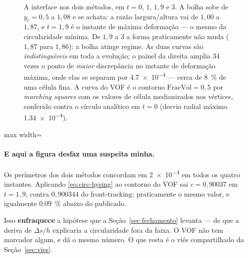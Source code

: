 \begin{figure}[htbp]
\begin{tikzpicture}
\end{tikzpicture}
\caption{A interface nos dois m\'etodos, em $t=0$, $1$, $1{,}9$ e $3$. A bolha
sobe de $y_c=0{,}5$ a $1{,}08$ e se achata: a raz\~ao largura/altura vai de
$1{,}00$ a $1{,}87$, e $t=1{,}9$ \'e o instante de m\'axima deforma\c{c}\~ao --- o
mesmo da circularidade m\'inima. De $1{,}9$ a $3$ a forma praticamente n\~ao muda
($1{,}87$ para $1{,}86$): a bolha atinge regime. As duas curvas s\~ao
\emph{indistingu\'iveis} em toda a evolu\c{c}\~ao; o painel da direita amplia 34
vezes o ponto de \emph{maior} discrep\^ancia no instante de deforma\c{c}\~ao
m\'axima, onde elas se separam por \num{4.7e-4} --- cerca de
\SI{8}{\percent} de uma c\'elula fina. A curva do VOF \'e o contorno
$\mathrm{FracVol}=0{,}5$ por \emph{marching squares} com os valores de c\'elula
medianizados nos v\'ertices, conferido contra o c\'irculo anal\'itico em $t=0$
(desvio radial m\'aximo \num{1.34e-4}).}
\label{fig:hysing-forma}
\end{figure}

\begin{adjustbox}{max width=\linewidth}
\end{adjustbox}

\paragraph{E aqui a figura desfaz uma suspeita minha.} Os per\'imetros dos dois
m\'etodos concordam em \num{2e-4} em todos os quatro instantes. Aplicando
\eqref{eq:circ-hysing} ao contorno do VOF sai $c=0{,}90037$ em $t=1{,}9$, contra
$0{,}900344$ do front-tracking: praticamente o mesmo valor, e igualmente
\SI{0.09}{\percent} abaixo do publicado.

Isso \textbf{enfraquece} a hip\'otese que a Se\c{c}\~ao~\ref{sec:fechamento}
levanta --- de que a deriva de $\Delta s/h$ explicaria a circularidade fora da
faixa. O VOF n\~ao tem marcador algum, e d\'a o mesmo n\'umero. O que resta \'e o
vi\'es compartilhado da Se\c{c}\~ao~\ref{sec:vies}.

